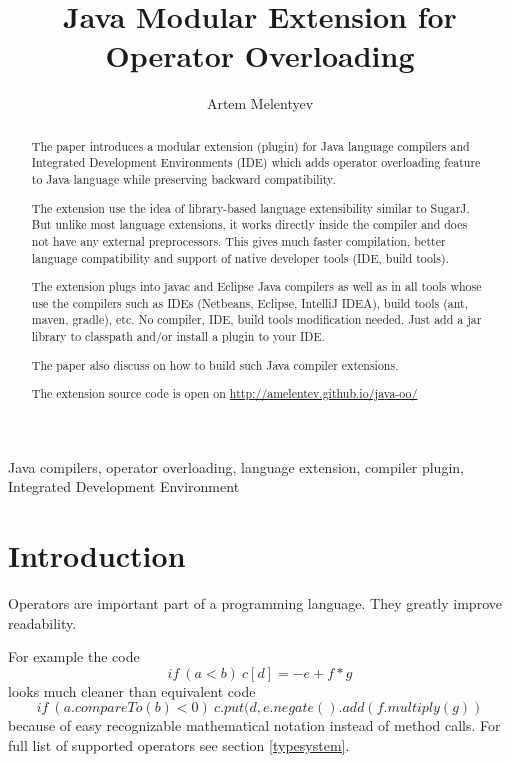 \documentclass{aircc}
\begin{document}
\title{
Java Modular Extension for \\ 
Operator Overloading
}

\author{Artem Melentyev}

\maketitle

\begin{abstract}
The paper introduces a modular extension (plugin) for Java language compilers and Integrated Development Environments (IDE)
which adds operator overloading feature to Java language while preserving backward compatibility.

The extension use the idea of library-based language extensibility similar to SugarJ\cite{sugarj}.
But unlike most language extensions, it works directly inside the compiler and does not have any external preprocessors.
This gives much faster compilation, better language compatibility and
support of native developer tools (IDE, build tools).

The extension plugs into javac and Eclipse Java compilers 
as well as in all tools whose use the compilers such as IDEs (Netbeans, Eclipse, IntelliJ IDEA), build tools (ant, maven, gradle), etc.
No compiler, IDE, build tools modification needed. Just add a jar library to classpath and/or install a plugin to your IDE.

The paper also discuss on how to build such Java compiler extensions.

The extension source code is open on 
\url{http://amelentev.github.io/java-oo/}
\end{abstract}

\begin{keywords}
Java compilers, operator overloading, language extension, compiler plugin, Integrated Development Environment
\end{keywords}

\section{Introduction}
Operators are important part of a programming language.
They greatly improve readability.

For example the code
$$if~(a<b)~c[d] = -e+f*g$$
looks much cleaner than equivalent code
$$if~(a.compareTo(b)<0)~c.put(d, e.negate().add(f.multiply(g))$$
because of easy recognizable mathematical notation instead of method calls. For full list of supported operators see section \ref{typesystem}.
\end{document}
